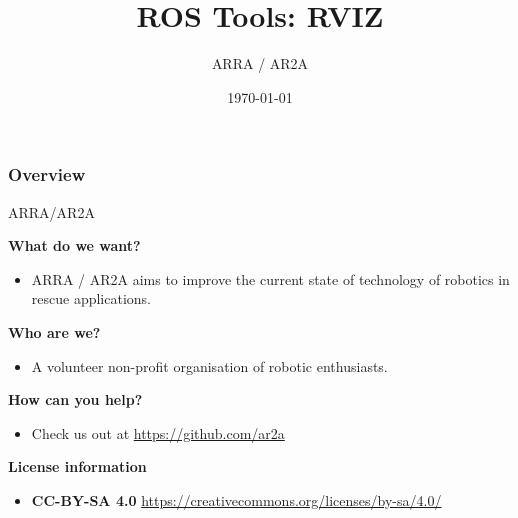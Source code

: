 \documentclass{beamer}
\title[]{ROS Tools: RVIZ} %
\author{ARRA / AR2A} %
\institute %
{
\textbf{A}dvancements for \textbf{R}obotics in \textbf{R}escue \textbf{A}pplications
}
\date{\today} %
\begin{document}
\begin{frame}
\titlepage %
\end{frame}
\begin{frame}
\frametitle{Overview} %
\tableofcontents %
\end{frame}
\begin{frame}{ARRA/AR2A}
\begin{large}\textbf{What do we want?}\end{large}
\begin{itemize}
 \item ARRA / AR2A aims to improve the current state of technology of robotics in rescue applications.
\end{itemize}
\begin{large}\textbf{Who are we?}\end{large}
\begin{itemize}
 \item A volunteer non-profit organisation of robotic enthusiasts.
\end{itemize}
\begin{large}\textbf{How can you help?}\end{large}
\begin{itemize}
 \item Check us out at \url{https://github.com/ar2a}
\end{itemize}
 \vspace{1cm}
\begin{large}\textbf{License information}\end{large}
\begin{itemize}
 \item \textbf{CC-BY-SA 4.0} \url{https://creativecommons.org/licenses/by-sa/4.0/}
\end{itemize}
\end{frame}
\end{document}
